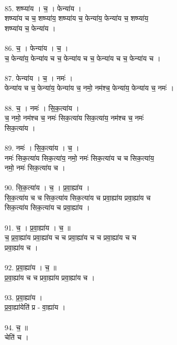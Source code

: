 \\
85. शष्प्या॑य । च॒ । फेन्या॑य ।\\
शष्प्या॑य च च॒ शष्प्या॑य॒ शष्प्या॑य च॒ फेन्या॑य॒ फेन्या॑य च॒ शष्प्या॑य॒\\
शष्प्या॑य च॒ फेन्या॑य ।\\
\\
86. च॒ । फेन्या॑य । च॒ ।\\
च॒ फेन्या॑य॒ फेन्या॑य च च॒ फेन्या॑य च च॒ फेन्या॑य च च॒ फेन्या॑य च ।\\
\\
87. फेन्या॑य । च॒ । नमः॑ ।\\
फेन्या॑य च च॒ फेन्या॑य॒ फेन्या॑य च॒ नमो॒ नम॑श्च॒ फेन्या॑य॒ फेन्या॑य च॒ नमः॑ ।\\
\\
88. च॒ । नमः॑ । सि॒क॒त्या॑य ।\\
च॒ नमो॒ नम॑श्च च॒ नमः॑ सिक॒त्या॑य सिक॒त्या॑य॒ नम॑श्च च॒ नमः॑\\
सिक॒त्या॑य ।\\
\\
89. नमः॑ । सि॒क॒त्या॑य । च॒ ।\\
नमः॑ सिक॒त्या॑य सिक॒त्या॑य॒ नमो॒ नमः॑ सिक॒त्या॑य च च सिक॒त्या॑य॒\\
नमो॒ नमः॑ सिक॒त्या॑य च ।\\
\\
90. सि॒क॒त्या॑य । च॒ । प्र॒वा॒ह्या॑य ।\\
सि॒क॒त्या॑य च च सिक॒त्या॑य सिक॒त्या॑य च प्रवा॒ह्या॑य प्रवा॒ह्या॑य च\\
सिक॒त्या॑य सिक॒त्या॑य च प्रवा॒ह्या॑य ।\\
\\
91. च॒ । प्र॒वा॒ह्या॑य । च॒ ॥\\
च॒ प्र॒वा॒ह्या॑य प्रवा॒ह्या॑य च च प्रवा॒ह्या॑य च च प्रवा॒ह्या॑य च च\\
प्रवा॒ह्या॑य च ।\\
\\
92. प्र॒वा॒ह्या॑य । च॒ ॥\\
प्र॒वा॒ह्या॑य च च प्रवा॒ह्या॑य प्रवा॒ह्या॑य च ।\\
\\
93. प्र॒वा॒ह्या॑य ।\\
प्र॒वा॒ह्या॑येति॑ प्र - वा॒ह्या॑य ।\\
\\
94. च॒ ॥\\
चेति॑ च ।\\
